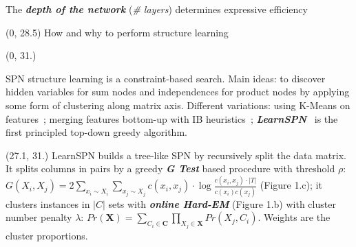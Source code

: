 \documentclass[final]{beamer}
\begin{document}
\begin{frame}{}
\begin{textblock}{25.7}
  The \emph{\textbf{depth of the network}} (\emph{\# layers})
  determines expressive efficiency~\parencite{Martens2014,Zhao2015}

  \end{textblock}
  
  \begin{textblock}{80}(0, 28.5)
    How and why to perform structure learning
    
  \end{textblock}
  
  \begin{textblock}{25.7}(0, 31.)
    \footnotesize
     
    SPN structure learning is a constraint-based
    search. Main ideas: to discover hidden variables for sum nodes and independences
    for product nodes by applying some form of clustering
    along matrix axis. Different variations:
    using K-Means on
    features~\emph{\parencite{Dennis2012}}; merging features bottom-up
    with IB heuristics\emph{~\parencite{Peharz2013}};
    \emph{\textbf{LearnSPN}}~\emph{\parencite{Gens2013}} is the first principled top-down greedy
    algorithm. 
    

      

      
  \end{textblock}
  
  \begin{textblock}{25.7}(27.1, 31.)
    \footnotesize
    LearnSPN builds a tree-like SPN by recursively split the data
    matrix.  It splits columns in pairs by a greedy \textbf{\emph{G Test}} based
    procedure with threshold $\rho$: $G(X_i, X_j) =  2\sum_{x_i \sim
      X_i}\sum_{x_j \sim X_j}c(x_i, x_j)\cdot \log\frac{c(x_i,
      x_j)\cdot |T|}{c(x_i)c(x_j)}$ (Figure 1.c); it clusters instances in
    $|C|$ sets with \textbf{\emph{online Hard-EM}} (Figure 1.b) with cluster number penalty
    $\lambda$: $Pr(\mathbf{X})= \sum_{C_i \in \mathbf{C}}\prod_{X_j
      \in \mathbf{X}}Pr(X_j,C_i)$. Weights are the cluster proportions.


\end{textblock}
\end{frame}
\end{document}
